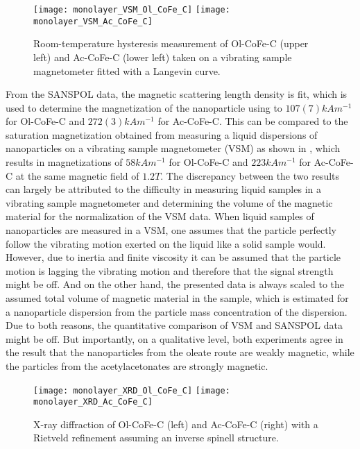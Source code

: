 \documentclass[\main/dresen_thesis.tex]{subfiles}
\begin{document}
    \begin{figure}[tb]
      \centering
      \texttt{[image: monolayer\_VSM\_Ol\_CoFe\_C]}
      \texttt{[image: monolayer\_VSM\_Ac\_CoFe\_C]}
      \caption{\label{fig:monolayers:nanoparticle:vsm}Room-temperature hysteresis measurement of Ol-CoFe-C (upper left) and Ac-CoFe-C (lower left) taken on a vibrating sample magnetometer fitted with a Langevin curve.}
    \end{figure}

    From the SANSPOL data, the magnetic scattering length density is fit, which is used to determine the magnetization of the nanoparticle using  to $107(7) \unit{kAm^{-1}}$ for Ol-CoFe-C and $272(3) \unit{kAm^{-1}}$ for Ac-CoFe-C.
    This can be compared to the saturation magnetization obtained from measuring a liquid dispersions of nanoparticles on a vibrating sample magnetometer (VSM) as shown in , which results in magnetizations of $58 \unit{kAm^{-1}}$ for Ol-CoFe-C and $223 \unit{kAm^{-1}}$ for Ac-CoFe-C at the same magnetic field of $1.2 \unit{T}$.
    The discrepancy between the two results can largely be attributed to the difficulty in measuring liquid samples in a vibrating sample magnetometer and determining the volume of the magnetic material for the normalization of the VSM data.
    When liquid samples of nanoparticles are measured in a VSM, one assumes that the particle perfectly follow the vibrating motion exerted on the liquid like a solid sample would.
    However, due to inertia and finite viscosity it can be assumed that the particle motion is lagging the vibrating motion and therefore that the signal strength might be off.
    And on the other hand, the presented data is always scaled to the assumed total volume of magnetic material in the sample, which is estimated for a nanoparticle dispersion from the particle mass concentration of the dispersion.
    Due to both reasons, the quantitative comparison of VSM and SANSPOL data might be off.
    But importantly, on a qualitative level, both experiments agree in the result that the nanoparticles from the oleate route are weakly magnetic, while the particles from the acetylacetonates are strongly magnetic.

    \begin{figure}[tb]
      \centering
      \texttt{[image: monolayer\_XRD\_Ol\_CoFe\_C]}
      \texttt{[image: monolayer\_XRD\_Ac\_CoFe\_C]}
      \caption{\label{fig:monolayers:nanoparticle:xrd}X-ray diffraction of Ol-CoFe-C (left) and Ac-CoFe-C (right) with a Rietveld refinement assuming an inverse spinell structure.}
    \end{figure}
\end{document}
